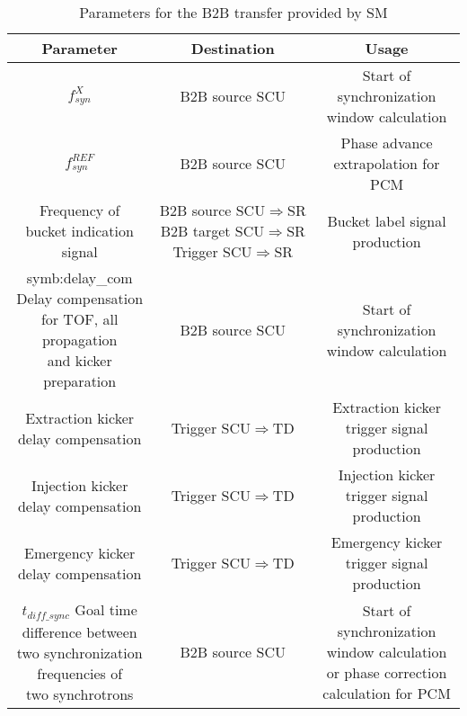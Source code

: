 \label{parameter_SM}
\begin{landscape} 
\begin{table}[!htb]

\caption{Parameters for the B2B transfer provided by SM}
\label{requirement}
\begin{center}
    \begin{tabular}{ | c | c | c |}
    \hline
\rowcolor[gray]{0.5}
     	Parameter &Destination & Usage  \\ \hline
$f_{\mathit{syn}}^X $							&	B2B source SCU	&	Start of synchronization window calculation\\ \hline
$f_{\mathit{syn}}^\mathit{REF} 	$			&	B2B source SCU	&	Phase advance extrapolation for PCM	\\ \hline
\tabincell{c}{Frequency of\\ bucket indication signal} 			&	\tabincell{c}{B2B source SCU$\Rightarrow$SR\\B2B target SCU$\Rightarrow$SR\\Trigger SCU$\Rightarrow$SR}& Bucket label signal production\\ \hline
\tabincell{c}{\gls{symb:delay_com} Delay compensation\\ for TOF, all propagation\\ and kicker preparation}	&	B2B source SCU	& Start of synchronization window calculation\\ \hline
\tabincell{c}{Extraction kicker \\delay compensation}&		Trigger SCU$\Rightarrow$TD			&Extraction kicker trigger signal production	\\ \hline
\tabincell{c}{Injection kicker \\delay compensation} &		Trigger SCU$\Rightarrow$TD			&Injection kicker trigger signal production\\ \hline
\tabincell{c}{Emergency kicker \\delay compensation} &		Trigger SCU$\Rightarrow$TD			&Emergency kicker trigger signal production\\ \hline
$t_{\mathit{diff\_sync}}$ \tabincell{c}{Goal time \\difference between\\ two synchronization \\frequencies of\\ two synchrotrons}							&		B2B source SCU	&\tabincell{c}{Start of synchronization window calculation \\ or phase correction calculation for PCM} \\ \hline

\end{tabular}
\end{center}
\end{table}
\end{landscape}
